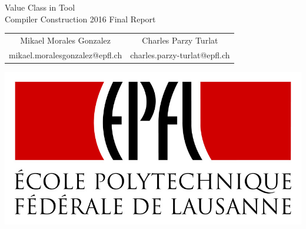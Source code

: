 \begin{titlepage}
\vspace*{\fill}
\begin{center}
{\huge Value Class in Tool\\}
\vspace*{\bigskipamount}
{\large Compiler Construction 2016 Final Report\\}
\vspace*{\bigskipamount}
\begin{tabular}{cc}
Mikael Morales Gonzalez & Charles Parzy Turlat\\
\small mikael.moralesgonzalez@epfl.ch & \small charles.parzy-turlat@epfl.ch
\end{tabular}

\vspace*{\bigskipamount}
\includegraphics[scale=1]{EPFL-Logo-RVB-96.jpg}
\end{center}
\vspace*{\fill}
\end{titlepage}